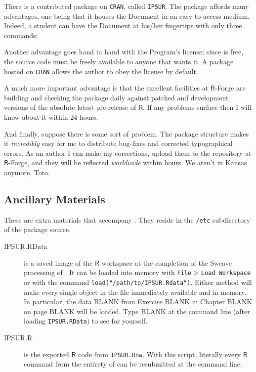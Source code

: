 \documentclass[captions=tableheading]{scrbook}
\begin{document}
There is a contributed package on \texttt{CRAN}, called \texttt{IPSUR}. The package affords many advantages, one being that it houses the  Document in an easy-to-access medium. Indeed, a student can have the Document at his/her fingertips with only three commands:



Another advantage goes hand in hand with the Program's license; since \IPSUR is free, the source code must be freely available to anyone that wants it. A package hosted on \texttt{CRAN} allows the author to obey the license by default.

A much more important advantage is that the excellent facilities at \(\mathsf{R}\)-Forge are building and checking the package daily against patched and development versions of the absolute latest pre-release of \(\mathsf{R}\). If any problems surface then I will know about it within 24 hours.

And finally, suppose there is some sort of problem. The package structure makes it \emph{incredibly} easy for me to distribute bug-fixes and corrected typographical errors. As an author I can make my corrections, upload them to the repository at \(\mathsf{R}\)-Forge, and they will be reflected \emph{worldwide} within hours. We aren't in Kansas anymore, Toto.

\subsection*{Ancillary Materials}

These are extra materials that accompany \IPSUR. They reside in the \texttt{/etc} subdirectory of the package source. 

\begin{description}
\item[IPSUR.RData] is a saved image of the \(\mathsf{R}\) workspace at the completion of the Sweave processing of \IPSUR. It can be loaded into memory with \texttt{File} \(\triangleright\) \texttt{Load Workspace} or with the command \texttt{load("/path/to/IPSUR.Rdata")}. Either method will make every single object in the file immediately available and in memory. In particular, the data BLANK from Exercise BLANK in Chapter BLANK on page BLANK will be loaded. Type BLANK at the command line (after loading \texttt{IPSUR.RData}) to see for yourself.
\item[IPSUR.R] is the exported \(\mathsf{R}\) code from \texttt{IPSUR.Rnw}. With this script, literally every \(\mathsf{R}\) command from the entirety of \IPSUR can be resubmitted at the command line.
\end{description}
\end{document}
